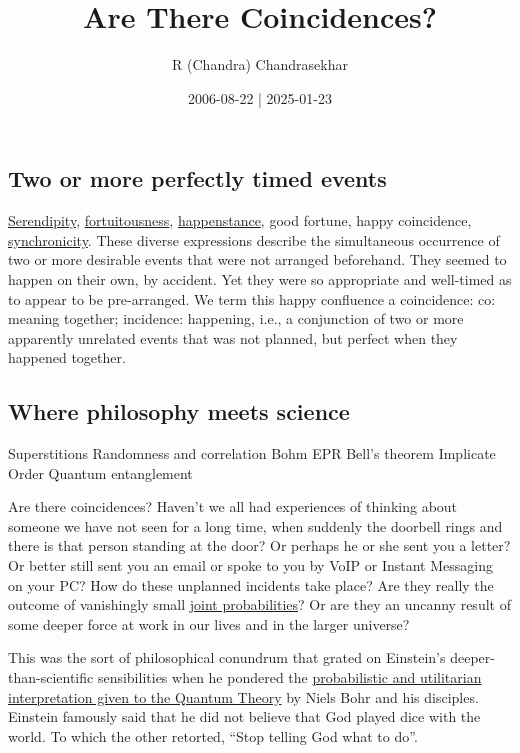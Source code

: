 \documentclass[
  a4paper,
]{article}
\title{Are There Coincidences?}
\author{R (Chandra) Chandrasekhar}
\date{2006-08-22 | 2025-01-23}
\begin{document}
\maketitle

\thispagestyle{empty}


\subsection{Two or more perfectly timed
events}\label{two-or-more-perfectly-timed-events}

\href{https://www.merriam-webster.com/dictionary/serendipity}{Serendipity},
\href{https://dictionary.cambridge.org/dictionary/english/fortuitousness}{fortuitousness},
\href{https://www.collinsdictionary.com/dictionary/english/happenstance}{happenstance},
good fortune, happy coincidence,
\href{https://www.vocabulary.com/dictionary/synchronicity}{synchronicity}.
These diverse expressions describe the simultaneous occurrence of two or
more desirable events that were not arranged beforehand. They seemed to
happen on their own, by accident. Yet they were so appropriate and
well-timed as to appear to be pre-arranged. We term this happy
confluence a coincidence: co: meaning together; incidence: happening,
i.e., a conjunction of two or more apparently unrelated events that was
not planned, but perfect when they happened together.

\subsection{Where philosophy meets
science}\label{where-philosophy-meets-science}

Superstitions Randomness and correlation Bohm EPR Bell's theorem
Implicate Order Quantum entanglement

Are there coincidences? Haven't we all had experiences of thinking about
someone we have not seen for a long time, when suddenly the doorbell
rings and there is that person standing at the door? Or perhaps he or
she sent you a letter? Or better still sent you an email or spoke to you
by VoIP or Instant Messaging on your PC? How do these unplanned
incidents take place? Are they really the outcome of vanishingly small
\href{https://www.aiplusinfo.com/blog/joint-probability-definition-formula-examples/}{joint
probabilities}? Or are they an uncanny result of some deeper force at
work in our lives and in the larger universe?

This was the sort of philosophical conundrum that grated on Einstein's
deeper-than-scientific sensibilities when he pondered the
\href{https://plato.stanford.edu/entries/qm-copenhagen/}{probabilistic
and utilitarian interpretation given to the Quantum Theory} by Niels
Bohr and his disciples. Einstein famously said that he did not believe
that God played dice with the world. To which the other retorted, ``Stop
telling God what to do''.
\end{document}
